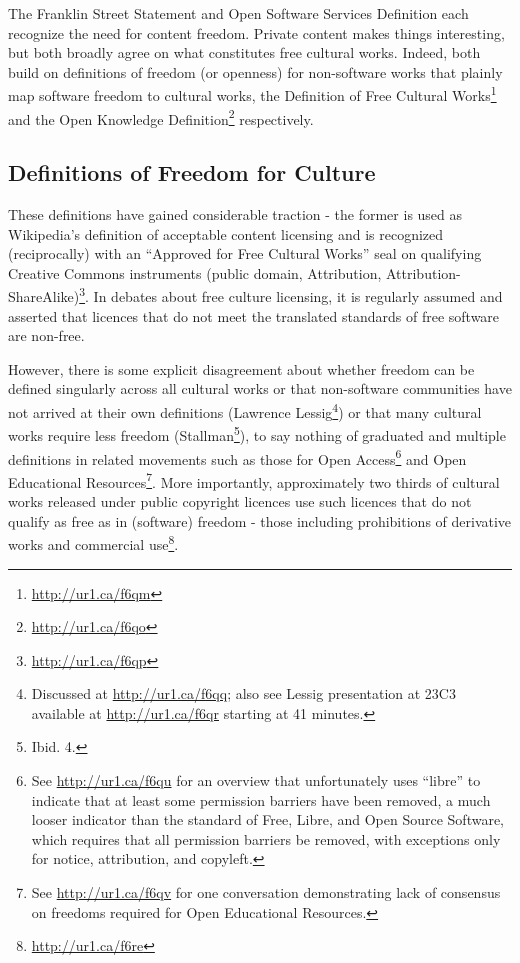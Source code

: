 The Franklin Street Statement and Open Software Services Def\hbox{}inition each
recognize the need for content freedom. Private content makes things
interesting, but both broadly agree on what constitutes free cultural works.
Indeed, both build on def\hbox{}initions of freedom (or openness) for
non-software works that plainly map software freedom to cultural works, the
Def\hbox{}inition of Free Cultural Works\footnote{\url{http://ur1.ca/f6qm}} and
the Open Knowledge Def\hbox{}inition\footnote{\url{http://ur1.ca/f6qo}}
respectively.


\subsection{Definitions of Freedom for Culture}
\label{ss:free_culture_software_freedom:freedom:def_freedom_culture}

These def\hbox{}initions have gained considerable traction - the former is used
as Wikipedia's def\hbox{}inition of acceptable content licensing and is
recognized (reciprocally) with an ``Approved for Free Cultural Works'' seal on
qualifying Creative Commons instruments (public domain, Attribution,
Attribution-ShareAlike)\footnote{\url{http://ur1.ca/f6qp}}. In debates about
free culture licensing, it is regularly assumed and asserted that licences that
do not meet the translated standards of free software are non-free.

However, there is some explicit disagreement about whether freedom can be
def\hbox{}ined singularly across all cultural works or that non-software
communities have not arrived at their own def\hbox{}initions (Lawrence
Lessig\footnote{Discussed at \url{http://ur1.ca/f6qq}; also see Lessig
presentation at 23C3 available at \url{http://ur1.ca/f6qr} starting at 41
minutes.}) or that many cultural works require less freedom
(Stallman\footnote{Ibid. 4.}), to say nothing of graduated and multiple
def\hbox{}initions in related movements such as those for Open
Access\footnote{See \url{http://ur1.ca/f6qu} for an overview that unfortunately
uses ``libre'' to indicate that at least some permission barriers have been
removed, a much looser indicator than the standard of Free, Libre, and Open
Source Software, which requires that all permission barriers be removed, with
exceptions only for notice, attribution, and copyleft.} and Open Educational
Resources\footnote{See \url{http://ur1.ca/f6qv} for one conversation
demonstrating lack of consensus on freedoms required for Open Educational
Resources.}. More importantly, approximately two thirds of cultural works
released under public copyright licences use such licences that do not qualify
as free as in (software) freedom - those including prohibitions of derivative
works and commercial use\footnote{\url{http://ur1.ca/f6re}}.

